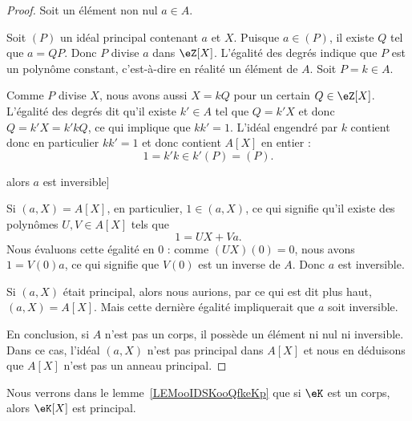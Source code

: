 \begin{proof}
	Soit un élément non nul \( a\in A\).
	\begin{subproof}
		\newcommand{\foo}{A[X]}

		Soit \( (P)\) un idéal principal contenant \( a\) et \( X\). Puisque \( a\in(P)\), il existe \( Q\) tel que \( a=QP\). Donc \( P\) divise \( a\) dans \( \eZ[X]\). L'égalité des degrés indique que \( P\) est un polynôme constant, c'est-à-dire en réalité un élément de \( A\). Soit \( P=k\in A\).

		Comme \( P\) divise \( X\), nous avons aussi \( X=kQ\) pour un certain \( Q\in \eZ[X]\). L'égalité des degrés dit qu'il existe \( k'\in A\) tel que \( Q=k'X\) et donc \( Q=k'X=k'kQ\), ce qui implique que \( kk'=1\). L'idéal engendré par \( k\) contient donc en particulier \( kk'=1\) et donc contient \( A[X]\) en entier :
		\begin{equation}
			1=k'k\in k'(P)=(P).
		\end{equation}

		\spitem[Si \( (a,X)=\foo\) alors \( a\) est inversible]

		Si \( (a,X)=A[X]\), en particulier, \( 1\in (a,X)\), ce qui signifie qu'il existe des polynômes \( U,V\in A[X]\) tels que
		\begin{equation}
			1=UX+Va.
		\end{equation}
		Nous évaluons cette égalité en \( 0\) : comme \( (UX)(0)=0\), nous avons \( 1=V(0)a\), ce qui signifie que \( V(0)\) est un inverse de \( A\). Donc \( a\) est inversible.


		Si \( (a,X)\) était principal, alors nous aurions, par ce qui est dit plus haut, \( (a,X)=A[X]\). Mais cette dernière égalité impliquerait que \( a\) soit inversible.
	\end{subproof}
	En conclusion, si \( A\) n'est pas un corps, il possède un élément ni nul ni inversible. Dans ce cas, l'idéal \( (a,X)\) n'est pas principal dans \( A[X]\) et nous en déduisons que \( A[X]\) n'est pas un anneau principal.
\end{proof}

Nous verrons dans le lemme~\ref{LEMooIDSKooQfkeKp} que si \( \eK\) est un corps, alors \( \eK[X]\) est principal.

